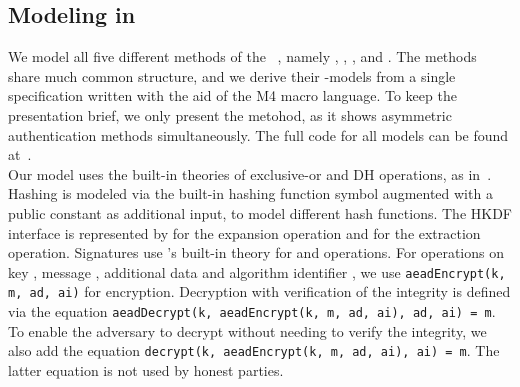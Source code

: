 \subsection{Modeling \mEdhoc{} in \mTamarin}
\label{sec:modeling}
%
We model all five different methods of the \mEdhoc{}
\mSpec~\cite{our-analysis-selander-lake-edhoc-01}, namely \mPskPsk,
\mSigSig, \mSigStat, \mStatSig{} and \mStatStat.
%
The methods share much common structure, and we derive
their \mTamarin{}-models from a single specification written with the aid of the
M4 macro language.
%
%
To keep the presentation brief, we only present the \mStatSig{} metohod, as it
shows asymmetric authentication methods simultaneously.
%
The full \mTamarin{} code for all models can be found at~\cite{edhocTamarinRepo}.
\\
%

Our model uses the built-in theories of exclusive-or and DH operations, as
in~\cite{DBLP:conf/csfw/DreierHRS18,DBLP:conf/csfw/SchmidtMCB12}.
%
Hashing is modeled via the built-in hashing function symbol augmented
with a public constant as additional input, to model different
hash functions.
%
%
The HKDF interface is represented by  for the
expansion operation and  for the extraction operation.
%
Signatures use \mTamarin's built-in theory for  and 
operations.
%
%
%
For \mAead{} operations on key , message \mbox{}, additional data 
and algorithm identifier , we use \lstinline{aeadEncrypt(k, m, ad, ai)}
for encryption.
%
Decryption with verification of the integrity is defined via the equation
\lstinline{aeadDecrypt(k, aeadEncrypt(k, m, ad, ai), ad, ai) = m}.
%
To enable the adversary to decrypt without needing to verify the integrity, we
also add the equation \lstinline{decrypt(k, aeadEncrypt(k, m, ad, ai), ai) = m}.
%
The latter equation is not used by honest parties.\\
%

